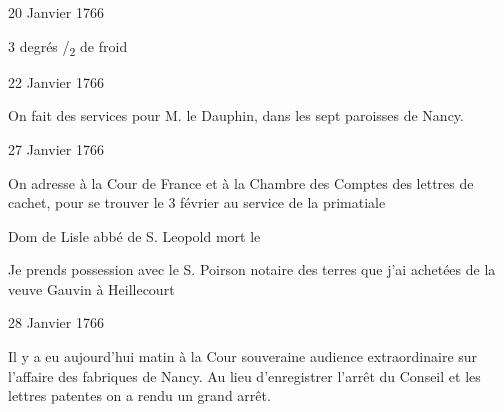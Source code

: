                      \begin{diary}{20 Janvier 1766}{}


                           3 degrés
                              /\textsubscript{2} de froid
                        \bigskip


                     \end{diary}

                     \begin{diary}{22 Janvier 1766}{}

                         On fait des services pour M. le Dauphin,
                           dans les sept paroisses de Nancy. \bigskip


                     \end{diary}

                     \begin{diary}{27 Janvier 1766}{}

                         On adresse à la Cour de France et à la Chambre des
                              Comptes des lettres de cachet, pour se trouver
                           le 3 février au service de
                              la primatiale
                        \bigskip



                           Dom de Lisle abbé de S. Leopold
                           mort le
                        \bigskip


                         Je prends possession avec le S.
                              Poirson
                           notaire des terres
                           que j'ai achetées de la veuve Gauvin à Heillecourt
                        \bigskip


                     \end{diary}

                     \begin{diary}{28 Janvier 1766}{}

                         Il y a eu aujourd'hui matin à
                              la Cour
                              souveraine audience extraordinaire
                           sur l'affaire des fabriques de
                              Nancy.
                           Au lieu d'enregistrer l'arrêt du Conseil
                           et les lettres patentes on
                           a rendu un
                           grand arrêt. \bigskip


                     \end{diary}

